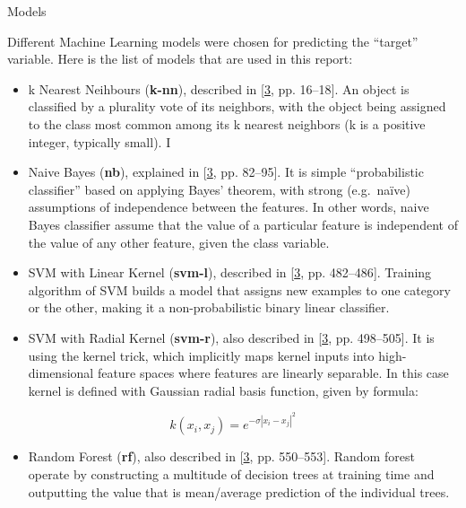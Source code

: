 \documentclass[
  ignorenonframetext,
]{beamer}
\providecommand{\tightlist}{%
  \setlength{\itemsep}{0pt}\setlength{\parskip}{0pt}}
\begin{document}
\begin{frame}{Models}
\protect\hypertarget{models}{}

Different Machine Learning models were chosen for predicting the
``target'' variable. Here is the list of models that are used in this
report:

\begin{itemize}
\item
  k Nearest Neihbours (\textbf{k-nn}), described in
  {[}\protect\hyperlink{ref-murphy}{3}, pp. 16--18{]}. An object is
  classified by a plurality vote of its neighbors, with the object being
  assigned to the class most common among its k nearest neighbors (k is
  a positive integer, typically small). I
\item
  Naive Bayes (\textbf{nb}), explained in
  {[}\protect\hyperlink{ref-murphy}{3}, pp. 82--95{]}. It is simple
  ``probabilistic classifier'' based on applying Bayes' theorem, with
  strong (e.g.~naïve) assumptions of independence between the features.
  In other words, naive Bayes classifier assume that the value of a
  particular feature is independent of the value of any other feature,
  given the class variable.
\item
  SVM with Linear Kernel (\textbf{svm-l}), described in
  {[}\protect\hyperlink{ref-murphy}{3}, pp. 482--486{]}. Training
  algorithm of SVM builds a model that assigns new examples to one
  category or the other, making it a non-probabilistic binary linear
  classifier.
\item
  SVM with Radial Kernel (\textbf{svm-r}), also described in
  {[}\protect\hyperlink{ref-murphy}{3}, pp. 498--505{]}. It is using the
  kernel trick, which implicitly maps kernel inputs into
  high-dimensional feature spaces where features are linearly separable.
  In this case kernel is defined with Gaussian radial basis function,
  given by formula:
\end{itemize}

\[k(x_{i}, x_{j}) = e ^ {- \sigma {|x_{i} - x_{j}|}^2 }\]

\begin{itemize}
\tightlist
\item
  Random Forest (\textbf{rf}), also described in
  {[}\protect\hyperlink{ref-murphy}{3}, pp. 550--553{]}. Random forest
  operate by constructing a multitude of decision trees at training time
  and outputting the value that is mean/average prediction of the
  individual trees.
\end{itemize}

\end{frame}
\end{document}
